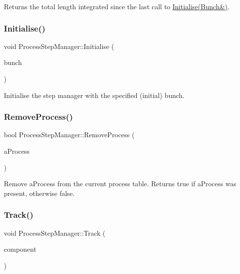Returns the total length integrated since the last call to \hyperlink{classProcessStepManager_aecc48b51ff3d561b5e7e0e82d23b38b5}{Initialise(\+Bunch\&)}. \mbox{\label{classProcessStepManager_aecc48b51ff3d561b5e7e0e82d23b38b5}} 
\subsubsection{\texorpdfstring{Initialise()}{Initialise()}}
{\footnotesize\ttfamily void Process\+Step\+Manager\+::\+Initialise (\begin{DoxyParamCaption}\item[{\hyperlink{classBunch}{Bunch} \&}]{bunch }\end{DoxyParamCaption})}

Initialise the step manager with the specified (initial) bunch. \mbox{\label{classProcessStepManager_a9795861d03d6eff0fecc49c98821f197}} 
\subsubsection{\texorpdfstring{Remove\+Process()}{RemoveProcess()}}
{\footnotesize\ttfamily bool Process\+Step\+Manager\+::\+Remove\+Process (\begin{DoxyParamCaption}\item[{\hyperlink{classBunchProcess}{Bunch\+Process} $\ast$}]{a\+Process }\end{DoxyParamCaption})}

Remove a\+Process from the current process table. Returns true if a\+Process was present, otherwise false. \mbox{\label{classProcessStepManager_acddc7adda6f07df634362afd97711a4e}} 
\subsubsection{\texorpdfstring{Track()}{Track()}}
{\footnotesize\ttfamily void Process\+Step\+Manager\+::\+Track (\begin{DoxyParamCaption}\item[{\hyperlink{classAcceleratorComponent}{Accelerator\+Component} \&}]{component }\end{DoxyParamCaption})}

